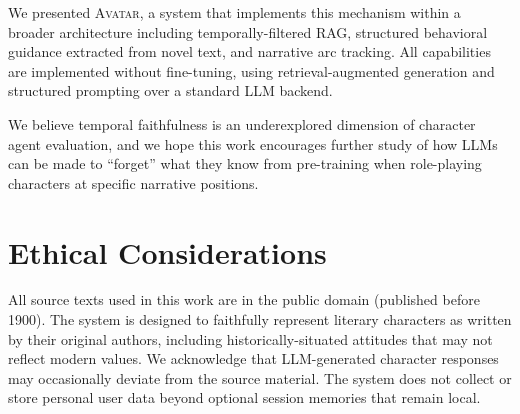 \documentclass[11pt,a4paper]{article}
\begin{document}
We presented \textsc{Avatar}, a system that implements this mechanism within a broader architecture including temporally-filtered RAG, structured behavioral guidance extracted from novel text, and narrative arc tracking.
All capabilities are implemented without fine-tuning, using retrieval-augmented generation and structured prompting over a standard LLM backend.

We believe temporal faithfulness is an underexplored dimension of character agent evaluation, and we hope this work encourages further study of how LLMs can be made to ``forget'' what they know from pre-training when role-playing characters at specific narrative positions.

\section*{Ethical Considerations}

All source texts used in this work are in the public domain (published before 1900).
The system is designed to faithfully represent literary characters as written by their original authors, including historically-situated attitudes that may not reflect modern values.
We acknowledge that LLM-generated character responses may occasionally deviate from the source material.
The system does not collect or store personal user data beyond optional session memories that remain local.



\end{document}
